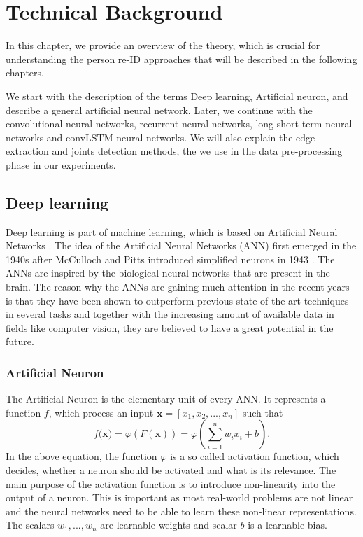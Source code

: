 \chapter{Technical Background} \label{ch:technical_background}

In this chapter, we provide an overview of the theory, which is crucial for understanding the person re-ID approaches that will be described in the following chapters. 

We start with the description of the terms Deep learning, Artificial neuron, and describe a general artificial neural network. Later, we continue with the convolutional neural networks, recurrent neural networks, long-short term neural networks and convLSTM neural networks. We will also explain the edge extraction and joints detection methods, the we use in the data pre-processing phase in our experiments.

\section{Deep learning}\label{tb:deep_learning}
Deep learning is part of machine learning, which is based on Artificial Neural Networks \cite{DLWiki}. The idea of the Artificial Neural Networks (ANN) first emerged in the 1940s after McCulloch and Pitts introduced simplified neurons in 1943 \cite{NN_introduction}. The ANNs are inspired by the biological neural networks that are present in the brain. The reason why the ANNs are gaining much attention in the recent years is that they have been shown to outperform previous state-of-the-art techniques in several tasks and together with the increasing amount of available data in fields like computer vision, they are believed to have a great potential in the future.

\subsection{Artificial Neuron}\label{tb:ann}
The Artificial Neuron is the elementary unit of every ANN. It represents a function $f$, which process an input $\textbf{x}=[x_1, x_2, ..., x_n]$ such that
\begin{equation}
    f(\textbf{x)}=\varphi(F(\textbf{x}))= \varphi(\sum_{i=1}^{n}w_ix_i + b).
\end{equation}
In the above equation, the function $\varphi$ is a so called activation function, which decides, whether a neuron should be activated and what is its relevance. The main purpose of the activation function is to introduce non-linearity into the output of a neuron. This is important as most real-world problems are not linear and the neural networks need to be able to learn these non-linear representations. The scalars $w_1,...,w_n$ are learnable weights and scalar $b$ is a learnable bias.

